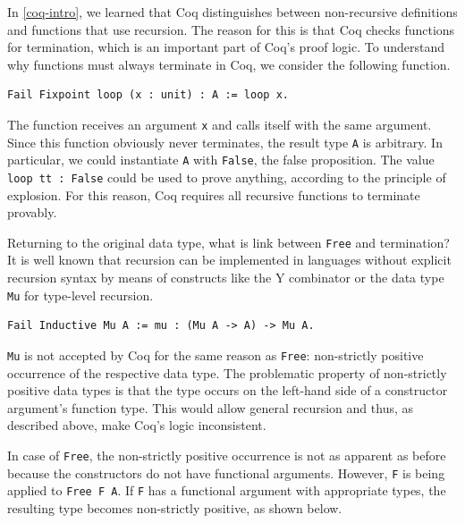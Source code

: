 \documentclass[a4paper, 11pt, fleqn, twoside]{scrreprt}
\begin{document}
In \autoref{coq-intro}, we learned that Coq distinguishes between 
non-recursive definitions and functions that use recursion. The reason for this 
is that Coq checks functions for termination, which is an important part of 
Coq's proof logic. To understand why functions must always terminate in Coq, we 
consider the following function.

\begin{verbatim}
Fail Fixpoint loop (x : unit) : A := loop x.
\end{verbatim}

The function receives an argument \texttt{x} and calls itself with the 
same argument. Since this function obviously never terminates, the result type 
\texttt{A} is arbitrary. In particular, we could instantiate 
\texttt{A} with \texttt{False}, the false proposition. The 
value \texttt{loop tt : False} could be used to prove anything,
according to the principle of explosion. For this reason, Coq requires all 
recursive functions to terminate provably.

Returning to the original data type, what is link between 
\texttt{Free} and termination? It is well known that recursion can be 
implemented in languages without explicit recursion syntax by means of 
constructs like the Y combinator or the data type \texttt{Mu} for 
type-level recursion.

\begin{verbatim}
Fail Inductive Mu A := mu : (Mu A -> A) -> Mu A.
\end{verbatim}

\texttt{Mu} is not accepted by Coq for the same reason as 
\texttt{Free}: non-strictly positive occurrence of the respective data 
type. The problematic property of non-strictly positive data types is that the 
type occurs on the left-hand side of a constructor argument's function type. 
This would allow general recursion and thus, as described above, make Coq's 
logic inconsistent.

In case of \texttt{Free}, the non-strictly positive occurrence is not 
as apparent as before because the constructors do not have functional 
arguments. However, \texttt{F} is being applied to 
\texttt{Free F A}. If \texttt{F} has a functional argument 
with appropriate types, the resulting type becomes non-strictly positive, as 
shown below.
\end{document}
